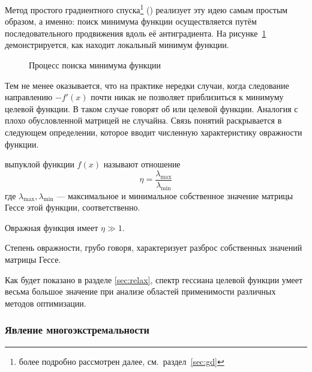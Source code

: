 Метод простого градиентного спуска\footnote{\gd{} более подробно
  рассмотрен далее, см. раздел \ref{sec:gd}} (\gd{}) реализует эту
идею самым простым образом, а именно: поиск минимума функции
осуществляется путём последовательного продвижения вдоль её
антиградиента. На рисунке \ref{fig:gd-works} демонстрируется, как
\gd{} находит локальный минимум функции.

\begin{figure}[!thb]
  \centering
  \caption{Процесс поиска минимума функции}
  \label{fig:gd-works}
\end{figure}

Тем не менее оказывается, что на практике нередки случаи, когда
следование направлению $-f'(x)$ почти никак не позволяет приблизиться
к минимуму целевой функции. В таком случае говорят об
 или  целевой
функции. Аналогия с плохо обусловленной матрицей не случайна. Связь
понятий раскрывается в следующем определении, которое вводит численную
характеристику овражности функции.

\begin{dfn}
  \label{dfn:ill-cond}
   выпуклой функции $f(x)$ называют
  отношение
  \begin{equation*}
    \eta = \frac{\lambda_{\max}}{\lambda_{\min}}
  \end{equation*}
  где $\lambda_{\max}, \lambda_{\min}$ — максимальное и минимальное
  собственное значение матрицы Гессе этой функции, соответственно.
\end{dfn}

Овражная функция имеет $\eta \gg 1$.

Степень овражности, грубо говоря, характеризует разброс собственных
значений матрицы Гессе. 

Как будет показано в разделе \ref{sec:relax}, спектр гессиана целевой
функции умеет весьма большое значение при анализе областей
применимости различных методов оптимизации.

\subsubsection{Явление многоэкстремальности}
